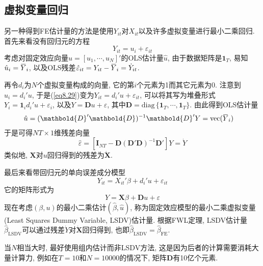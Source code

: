 \documentclass[cn, 12pt, math=mtpro2, bibstyle=apa, blue, twocol]{elegantbook}
\newcommand{\X}{\mathbold{X}}
\newcommand{\hb}{\hat{\beta}}
\newcommand{\overbar}[1]{\mkern 1.5mu\overline{\mkern-1.5mu#1\mkern-1.5mu}\mkern 1.5mu}
\begin{document}
\subsection{虚拟变量回归}
另一种得到FE估计量的方法是使用$Y_{it}$对$X_{it}$以及许多虚拟变量进行最小二乘回归. 首先来看没有回归元的方程
\begin{equation}\label{eq8.29}
  Y_{it}=u_i+\varepsilon_{it}
\end{equation}
考虑对固定效应向量$u=[u_1,\cdots,u_N]'$的OLS估计量$\hat{u}$, 由于数据矩阵是$\mathbf{1}_{T}$, 易知$\hat{u}_i=\overbar{Y}_i$, 以及OLS残差$\hat{\varepsilon}_{it}=Y_{it}-\overbar{Y}_i=\dot{Y}_{it}$.

再令$d_i$为$N$个虚拟变量构成的向量, 它的第$i$个元素为1而其它元素为0. 注意到$u_i=d_i'u$, 于是(\ref{eq8.29})变为$Y_{it}=d_i'u+\varepsilon_{it}$, 可以将其写为堆叠形式$Y_i=\mathbf{1}_id_i'u+\varepsilon_i$, 以及$Y=\mathbold{D}u+\varepsilon$, 其中$\mathbold{D}=\text{diag}\,\{\mathbf{1}_T,\cdots,\mathbf{1}_T\}$. 由此得到OLS估计量
\begin{align*}
\hat{u}&=(\mathbold{D}'\mathbold{D})^{-1}\mathbold{D}'Y=\text{vec}(\overbar{Y}_i)
\end{align*}
于是可得$NT\times 1$维残差向量
$$\hat{\varepsilon}=[\mathbold{I}_{NT}-\mathbold{D}(\mathbold{D}'\mathbold{D})^{-1}\mathbold{D}']Y=\dot{Y}$$
类似地, $\X$对$u$回归得到的残差为$\dot{\X}$.

最后来看带回归元的单向误差成分模型
$$Y_{it}=X_{it}'\beta+d_i'u+\varepsilon_{it}$$
它的矩阵形式为
$$Y=\X\beta+\mathbold{D}u+\varepsilon$$
现在考虑$(\beta,u)$的最小二乘估计$(\hb,\hat{u})$, 称为固定效应模型的最小二乘虚拟变量 (Least Squares Dummy Variable, LSDV)估计量. 根据FWL定理, LSDV估计量$\hb_{\text{LSDV}}$可以通过残差$\dot{Y}$对$\dot{\X}$回归得到, 也即$\hb_{\text{LSDV}}=\hb_{\text{FE}}$.

当$N$相当大时, 最好使用组内估计而非LSDV方法, 这是因为后者的计算需要消耗大量计算力, 例如在$T=10$和$N=10000$的情况下, 矩阵$\mathbold{D}$有10亿个元素.
\end{document}
